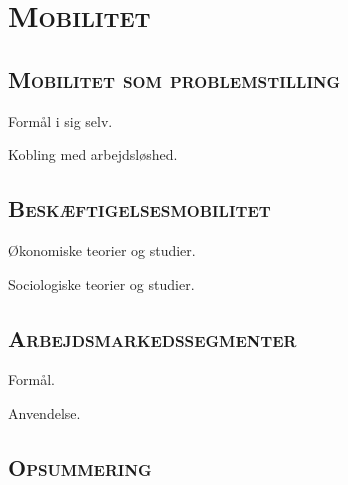 
\newpage \section{\textsc{Mobilitet \label{}}}


\subsection{\textsc{Mobilitet som problemstilling}}

Formål i sig selv. 

Kobling med arbejdsløshed.


\subsection{\textsc{Beskæftigelsesmobilitet}}

Økonomiske teorier og studier. %

Sociologiske teorier og studier. %



\subsection{\textsc{Arbejdsmarkedssegmenter}}

Formål.

Anvendelse. %



\subsection{\textsc{Opsummering}}



